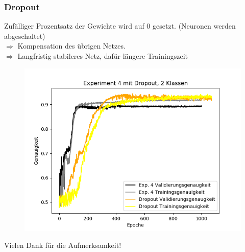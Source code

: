 \documentclass{beamer}
\begin{document}
\frame
{
	\frametitle{Dropout}
	Zufälliger Prozentsatz der Gewichte wird auf $0$ gesetzt. (Neuronen werden abgeschaltet)\\
	$\Rightarrow$ Kompensation des übrigen Netzes.\\
	$\Rightarrow$ Langfristig stabileres Netz, dafür längere Trainingszeit
	\begin{figure}[h!]
		\centering
		\includegraphics[width=0.5\linewidth,height=0.5\textheight, keepaspectratio]{res/old/dopout.png}
	\end{figure}
}



\frame
{
	\begin{center}
		\Large Vielen Dank für die Aufmerksamkeit!
		\normalsize
		\end{center}
}
\end{document}
